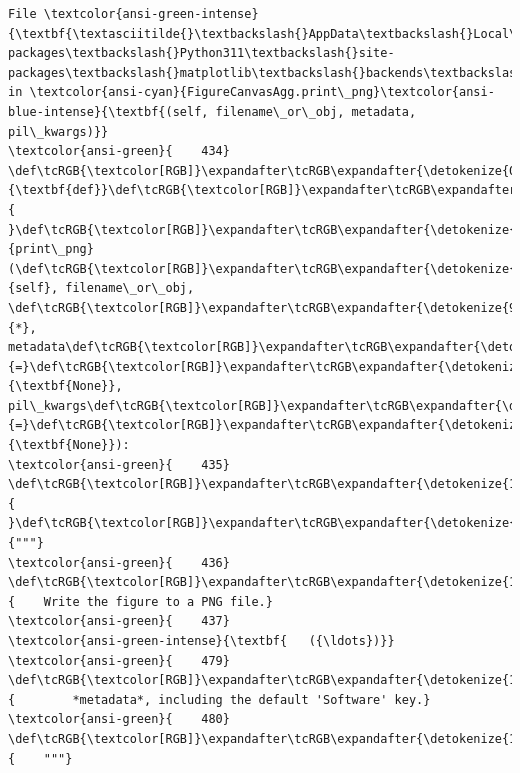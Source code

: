 \documentclass[11pt]{article}
\begin{document}
\begin{Verbatim}[commandchars=\\\{\}, frame=single, framerule=2mm, rulecolor=\color{outerrorbackground}]
File \textcolor{ansi-green-intense}{\textbf{\textasciitilde{}\textbackslash{}AppData\textbackslash{}Local\textbackslash{}Packages\textbackslash{}PythonSoftwareFoundation.Python.3.11\_qbz5n2kfra8p0\textbackslash{}LocalCache\textbackslash{}local-packages\textbackslash{}Python311\textbackslash{}site-packages\textbackslash{}matplotlib\textbackslash{}backends\textbackslash{}backend\_agg.py:481}}, in \textcolor{ansi-cyan}{FigureCanvasAgg.print\_png}\textcolor{ansi-blue-intense}{\textbf{(self, filename\_or\_obj, metadata, pil\_kwargs)}}
\textcolor{ansi-green}{    434} \def\tcRGB{\textcolor[RGB]}\expandafter\tcRGB\expandafter{\detokenize{0,135,0}}{\textbf{def}}\def\tcRGB{\textcolor[RGB]}\expandafter\tcRGB\expandafter{\detokenize{188,188,188}}{ }\def\tcRGB{\textcolor[RGB]}\expandafter\tcRGB\expandafter{\detokenize{0,0,255}}{print\_png}(\def\tcRGB{\textcolor[RGB]}\expandafter\tcRGB\expandafter{\detokenize{0,135,0}}{self}, filename\_or\_obj, \def\tcRGB{\textcolor[RGB]}\expandafter\tcRGB\expandafter{\detokenize{98,98,98}}{*}, metadata\def\tcRGB{\textcolor[RGB]}\expandafter\tcRGB\expandafter{\detokenize{98,98,98}}{=}\def\tcRGB{\textcolor[RGB]}\expandafter\tcRGB\expandafter{\detokenize{0,135,0}}{\textbf{None}}, pil\_kwargs\def\tcRGB{\textcolor[RGB]}\expandafter\tcRGB\expandafter{\detokenize{98,98,98}}{=}\def\tcRGB{\textcolor[RGB]}\expandafter\tcRGB\expandafter{\detokenize{0,135,0}}{\textbf{None}}):
\textcolor{ansi-green}{    435} \def\tcRGB{\textcolor[RGB]}\expandafter\tcRGB\expandafter{\detokenize{188,188,188}}{    }\def\tcRGB{\textcolor[RGB]}\expandafter\tcRGB\expandafter{\detokenize{175,0,0}}{"""}
\textcolor{ansi-green}{    436} \def\tcRGB{\textcolor[RGB]}\expandafter\tcRGB\expandafter{\detokenize{175,0,0}}{    Write the figure to a PNG file.}
\textcolor{ansi-green}{    437} 
\textcolor{ansi-green-intense}{\textbf{   ({\ldots})}}
\textcolor{ansi-green}{    479} \def\tcRGB{\textcolor[RGB]}\expandafter\tcRGB\expandafter{\detokenize{175,0,0}}{        *metadata*, including the default 'Software' key.}
\textcolor{ansi-green}{    480} \def\tcRGB{\textcolor[RGB]}\expandafter\tcRGB\expandafter{\detokenize{175,0,0}}{    """}

\end{Verbatim}
\end{document}
